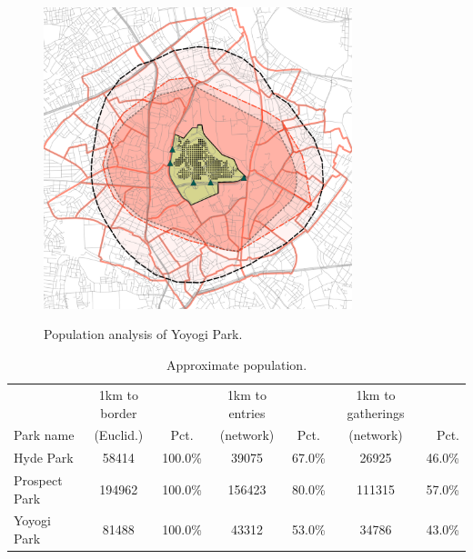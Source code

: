 \begin{figure}[ht]
  \centering
  \captionsetup{width=0.8\textwidth}
  \includegraphics[width=0.8\textwidth]{images/network/yoyogi_approx_pop.png} \\
  \vspace{10pt}
  \caption[Yoyogi Park - population]{Population analysis of Yoyogi Park.}
  \label{fig:yoyogi_1km_pop}
\end{figure}

\begin{table}[h]
\centering
\small
\begin{tabular}{lcccccr}
\toprule
{} &  1km to border &    {} &  1km to entries &   {} &  1km to gatherings &   {} \\
Park name &  (Euclid.) &    Pct. &  (network) &   Pct. &  (network) &   Pct. \\
\midrule
Hyde Park &         58414 &  100.0\% &                39075 &  67.0\% &                  26925 &  46.0\% \\
Prospect Park &        194962 &  100.0\% &               156423 &  80.0\% &                 111315 &  57.0\% \\
Yoyogi Park &         81488 &  100.0\% &                43312 &  53.0\% &                  34786 &  43.0\% \\
\bottomrule
\end{tabular}
\caption[Approximate population]{Approximate population.}
\label{table:approx_pop}
\end{table}

